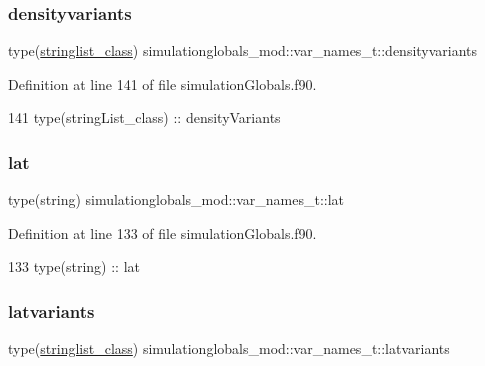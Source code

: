 \subsubsection{\texorpdfstring{densityvariants}{densityvariants}}
{\footnotesize\ttfamily type(\mbox{\hyperlink{structsimulationglobals__mod_1_1stringlist__class}{stringlist\+\_\+class}}) simulationglobals\+\_\+mod\+::var\+\_\+names\+\_\+t\+::densityvariants\hspace{0.3cm}{\ttfamily [private]}}



Definition at line 141 of file simulation\+Globals.\+f90.


\begin{DoxyCode}
141         \textcolor{keywordtype}{type}(stringList\_class) :: densityVariants
\end{DoxyCode}
\mbox{\label{structsimulationglobals__mod_1_1var__names__t_aab90536922d15a1684cb7d0cfce99e95}} 
\subsubsection{\texorpdfstring{lat}{lat}}
{\footnotesize\ttfamily type(string) simulationglobals\+\_\+mod\+::var\+\_\+names\+\_\+t\+::lat\hspace{0.3cm}{\ttfamily [private]}}



Definition at line 133 of file simulation\+Globals.\+f90.


\begin{DoxyCode}
133         \textcolor{keywordtype}{type}(string) :: lat
\end{DoxyCode}
\mbox{\label{structsimulationglobals__mod_1_1var__names__t_a7cd8cf017ecfa616f6700b86361b9b1f}} 
\subsubsection{\texorpdfstring{latvariants}{latvariants}}
{\footnotesize\ttfamily type(\mbox{\hyperlink{structsimulationglobals__mod_1_1stringlist__class}{stringlist\+\_\+class}}) simulationglobals\+\_\+mod\+::var\+\_\+names\+\_\+t\+::latvariants\hspace{0.3cm}{\ttfamily [private]}}



